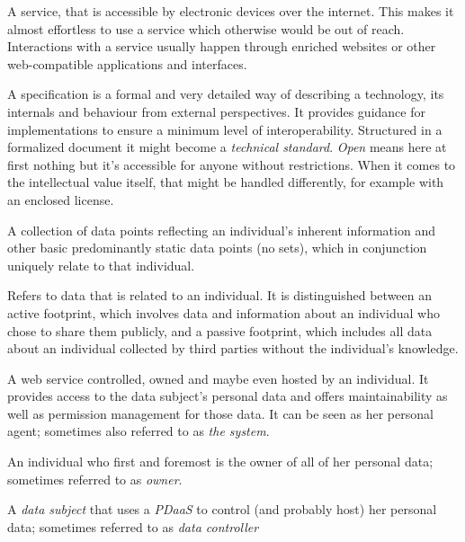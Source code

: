 \documentclass[12pt,english,a4paper,titlepage,cleardoublepage=empty,dottedtoc]{report}
\providecommand{\tightlist}{%
  \setlength{\itemsep}{0pt}\setlength{\parskip}{0pt}}
\begin{document}
\begin{description}
\tightlist
\item[Web Service:]
A service, that is accessible by electronic devices over the internet.
This makes it almost effortless to use a service which otherwise would
be out of reach. Interactions with a service usually happen through
enriched websites or other web-compatible applications and interfaces.
\item[Open Specification:]
A specification is a formal and very detailed way of describing a
technology, its internals and behaviour from external perspectives. It
provides guidance for implementations to ensure a minimum level of
interoperability. Structured in a formalized document it might become a
\emph{technical standard}. \emph{Open} means here at first nothing but
it's accessible for anyone without restrictions. When it comes to the
intellectual value itself, that might be handled differently, for
example with an enclosed license.
\item[\protect\hypertarget{terminologies--profile-data}{}{Profile
Data}:]
A collection of data points reflecting an individual's inherent
information and other basic predominantly static data points (no sets),
which in conjunction uniquely relate to that individual.
\item[\protect\hypertarget{terminologies--digital-footprint}{}{Digital
Footprint}:]
Refers to data that is related to an individual. It is distinguished
between an active footprint, which involves data and information about
an individual who chose to share them publicly, and a passive footprint,
which includes all data about an individual collected by third parties
without the individual's knowledge.
\item[Personal Data as a Service (PDaaS):]
A web service controlled, owned and maybe even hosted by an individual.
It provides access to the data subject's personal data and offers
maintainability as well as permission management for those data. It can
be seen as her personal agent; sometimes also referred to as \emph{the
system}.
\item[Data Subject:]
An individual who first and foremost is the owner of all of her personal
data; sometimes referred to as \emph{owner}.
\item[\protect\hypertarget{terminologies--operator}{}{Operator}:]
A \emph{data subject} that uses a \emph{PDaaS} to control (and probably
host) her personal data; sometimes referred to as \emph{data controller}
\item[\protect\hypertarget{terminologies--consumer}{}{(Data) Consumer}:]

\end{description}
\end{document}
